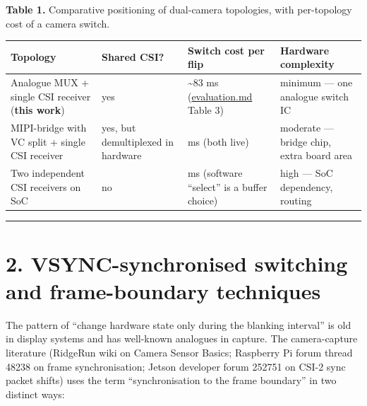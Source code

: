 \textbf{Table 1.} Comparative positioning of dual-camera topologies,
with per-topology cost of a camera switch.

{\def\LTcaptype{none} %
\begin{longtable}[]{@{}
  >{\raggedright\arraybackslash}p{}
  >{\raggedright\arraybackslash}p{}
  >{\raggedright\arraybackslash}p{}
  >{\raggedright\arraybackslash}p{}@{}}
\toprule\noalign{}
\begin{minipage}[b]{\linewidth}\raggedright
Topology
\end{minipage} & \begin{minipage}[b]{\linewidth}\raggedright
Shared CSI?
\end{minipage} & \begin{minipage}[b]{\linewidth}\raggedright
Switch cost per flip
\end{minipage} & \begin{minipage}[b]{\linewidth}\raggedright
Hardware complexity
\end{minipage} \\
\midrule\noalign{}
\endhead
\bottomrule\noalign{}
\endlastfoot
Analogue MUX + single CSI receiver (\textbf{this work}) & yes &
\textasciitilde83 ms (\url{evaluation.md} Table 3) & minimum --- one
analogue switch IC \\
MIPI-bridge with VC split + single CSI receiver & yes, but demultiplexed
in hardware & 0 ms (both live) & moderate --- bridge chip, extra board
area \\
Two independent CSI receivers on SoC & no & 0 ms (software ``select'' is
a buffer choice) & high --- SoC dependency, routing \\
\end{longtable}
}

\begin{center}\rule{0.5\linewidth}{0.5pt}\end{center}

\section{2. VSYNC-synchronised switching and frame-boundary
techniques}\label{vsync-synchronised-switching-and-frame-boundary-techniques}

The pattern of ``change hardware state only during the blanking
interval'' is old in display systems and has well-known analogues in
capture. The camera-capture literature (RidgeRun wiki on Camera Sensor
Basics; Raspberry Pi forum thread 48238 on frame synchronisation; Jetson
developer forum 252751 on CSI-2 sync packet shifts) uses the term
``synchronisation to the frame boundary'' in two distinct ways:

